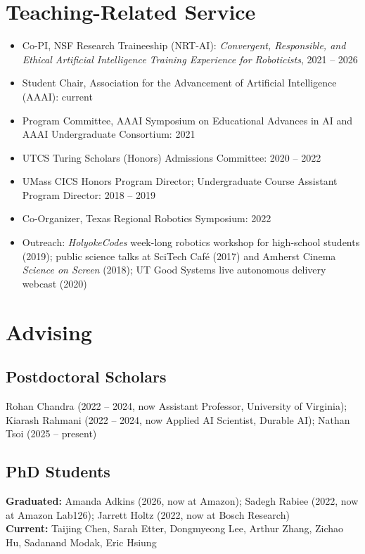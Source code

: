 \documentclass[Times]{article}
\begin{document}
\section*{Teaching-Related Service}
\begin{itemize}
  \item Co-PI, NSF Research Traineeship (NRT-AI): \emph{Convergent, Responsible, and Ethical Artificial
  Intelligence Training Experience for Roboticists}, 2021 -- 2026
  \item Student Chair, Association for the Advancement of Artificial Intelligence (AAAI): current
  \item Program Committee, AAAI Symposium on Educational Advances in AI and AAAI Undergraduate
  Consortium: 2021
  \item UTCS Turing Scholars (Honors) Admissions Committee: 2020 -- 2022
  \item UMass CICS Honors Program Director; Undergraduate Course Assistant Program Director: 2018 -- 2019
  \item Co-Organizer, Texas Regional Robotics Symposium: 2022
  \item Outreach: \emph{HolyokeCodes} week-long robotics workshop for high-school students (2019);
  public science talks at SciTech Caf\'e (2017) and Amherst Cinema \emph{Science on Screen} (2018);
  UT Good Systems live autonomous delivery webcast (2020)
\end{itemize}

\section*{Advising}
\subsection*{Postdoctoral Scholars}
Rohan Chandra (2022 -- 2024, now Assistant Professor, University of Virginia);
Kiarash Rahmani (2022 -- 2024, now Applied AI Scientist, Durable AI);
Nathan Tsoi (2025 -- present)

\subsection*{PhD Students}
\textbf{Graduated:}
Amanda Adkins (2026, now at Amazon);
Sadegh Rabiee (2022, now at Amazon Lab126);
Jarrett Holtz (2022, now at Bosch Research)\\
\textbf{Current:}
Taijing Chen, Sarah Etter, Dongmyeong Lee, Arthur Zhang, Zichao Hu, Sadanand Modak, Eric Hsiung
\end{document}
